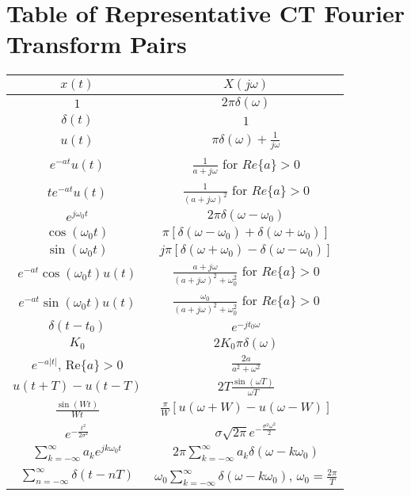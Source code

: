 \section{Table of Representative CT Fourier Transform Pairs}
\label{table:ctft}
  \begin{center}
    \bgroup
    \def\arraystretch{2}
    \setlength\tabcolsep{1em}

    \begin{tabular}{|c|c|}
      \hline
      $x(t)$ & $X(j\omega)$\\
      \hline
      \hline
      $1$ & $2\pi\delta(\omega)$\\
      $\delta(t)$ & $1$\\
      $u(t)$ & $\pi\delta(\omega) + \frac{1}{j\omega}$\\
      $e^{-at}u(t)$ & $\frac{1}{a + j\omega}$ for $Re\{a\} > 0$\\
      $te^{-at}u(t)$ & $\frac{1}{\left(a + j\omega\right)^2}$ for $Re\{a\} > 0$\\
      $e^{j\omega_0 t}$ & $2\pi\delta(\omega-\omega_0)$\\
      $\cos(\omega_0 t)$ & $\pi\left[ \delta(\omega-\omega_0) + \delta(\omega+\omega_0)\right]$\\
      $\sin(\omega_0 t)$ & $j\pi\left[ \delta(\omega+\omega_0) - \delta(\omega-\omega_0)\right]$\\
      $e^{-at}\cos(\omega_0 t)u(t)$ & $\frac{a+j\omega}{(a+j\omega)^2 + \omega_0^2}$ for $Re\{a\} > 0$\\
      $e^{-at}\sin(\omega_0 t)u(t)$ & $\frac{\omega_0}{(a+j\omega)^2 + \omega_0^2}$ for $Re\{a\} > 0$\\
      $\delta(t - t_0)$  & $e^{-j t_0 \omega}$ \\ 
      $K_0$  & $2 K_0 \pi \delta(\omega)$ \\ 
      $e^{-a|t|}$, $\text{Re}\{a\} > 0$   & $\frac{2a}{a^2 + \omega^2}$ \\ 
      $u(t + T) - u(t - T)$  & $2T \frac{\sin{(\omega T)}}{\omega T}$ \\  
      $\frac{\sin{({W}t)}}{W t}$  & $\frac{\pi}{W} [u(\omega + W) - u(\omega - W)]$ \\ 
      $e^{-\frac{t^2}{2 \sigma^2}}$  & $\sigma \sqrt{2 \pi} e^{-\frac{\sigma^2 \omega^2}{2}} $ \\  
      $\sum\limits_{k=-\infty}^{\infty} a_k e^{j k \omega_0 t}$  & $2 \pi \sum\limits_{k=-\infty}^{\infty} a_k \delta{(\omega - k \omega_0)}$ \\ 
      $\sum\limits_{n=-\infty}^{\infty} \delta(t - nT)$  & $\omega_0 \sum\limits_{k=-\infty}^{\infty} \delta{(\omega - k \omega_0)}$, $\omega_0 = \frac{2 \pi}{T}$ \\  \hline
    \end{tabular}
    \egroup
  \end{center}

